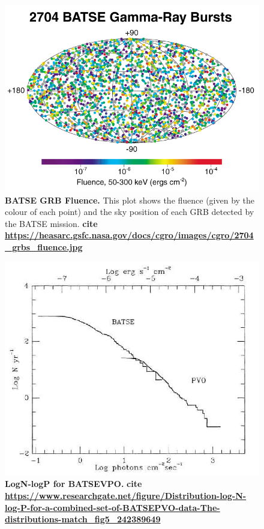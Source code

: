 \documentclass[11pt]{cuthesis}
\begin{document}
\begin{figure} %
\begin{center}
\includegraphics[width=0.8\linewidth]{batse_grbs_fluence.jpg}
\end{center}
\caption{\textbf{BATSE GRB Fluence.} This plot shows the fluence (given by the colour of each point) and the sky position of each GRB detected by the BATSE mission. \textbf{cite \url{https://heasarc.gsfc.nasa.gov/docs/cgro/images/cgro/2704_grbs_fluence.jpg}}}
\label{fig:batse grb fluence}
\end{figure}

\begin{figure} %
\begin{center}
\includegraphics[width=0.8\linewidth]{logN-logP.png}
\end{center}
\caption{\textbf{LogN-logP for BATSEVPO.}  \textbf{cite \url{https://www.researchgate.net/figure/Distribution-log-N-log-P-for-a-combined-set-of-BATSEPVO-data-The-distributions-match_fig5_242389649}}}
\label{fig:logn - logp}
\end{figure}
\end{document}
